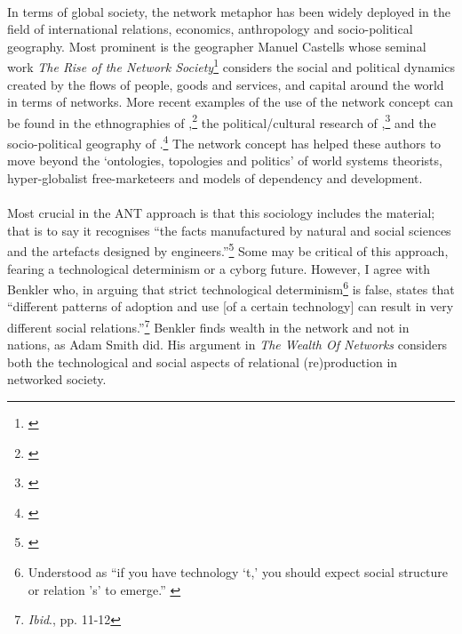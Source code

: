 \paragraph{}In terms of global society, the network metaphor has been widely deployed in the field of international relations, economics, anthropology and socio-political geography. Most prominent is the geographer Manuel Castells whose seminal work \textit{The Rise of the Network Society}\footnote{\cite{Castells:1996ns}} considers the social and political dynamics created by the flows of people, goods and services, and capital around the world in terms of networks. More recent examples of the use of the network concept can be found in the ethnographies of ,\footnote{\cite{Appadurai:1996lp}} the political/cultural research of ,\footnote{\cite{Terranova:2004ly}} and the socio-political geography of .\footnote{\cite{Barry:2001ff}} The network concept has helped these authors to move beyond the `ontologies, topologies and politics' of world systems theorists, hyper-globalist free-marketeers and models of dependency and development.

\paragraph{}Most crucial in the ANT approach is that this sociology includes the material; that is to say it recognises ``the facts manufactured by natural and social sciences and the artefacts designed by engineers.''\footnote{\cite{latour:1998ant1}} Some may be critical of this approach, fearing a technological determinism or a cyborg future. However, I agree with Benkler who, in arguing that strict technological determinism\footnote{Understood as ``if you have technology `t,' you should expect social structure or relation 's' to emerge.'' \cite[pp. 11-12]{benkler:2006wn}} is false, states that ``different patterns of adoption and use [of a certain technology] can result in very different social relations.''\footnote{\textit{Ibid}., pp. 11-12} Benkler finds wealth in the network and not in nations, as Adam Smith did. His argument in \textit{The Wealth Of Networks} considers both the technological and social aspects of relational (re)production in networked society. 

